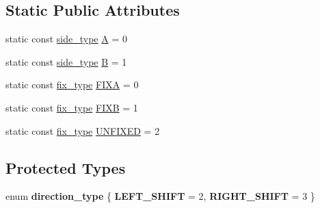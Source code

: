 \subsection*{Static Public Attributes}
\begin{DoxyCompactItemize}
\item 
static const \mbox{\hyperlink{classratio__cut__partition_ace53442bd0c1e21fbf00858ec6f6b456}{side\+\_\+type}} \mbox{\hyperlink{classratio__cut__partition_ae1a3cd1c2ede82023f9a229e40909139}{A}} = 0
\item 
static const \mbox{\hyperlink{classratio__cut__partition_ace53442bd0c1e21fbf00858ec6f6b456}{side\+\_\+type}} \mbox{\hyperlink{classratio__cut__partition_adf075987228d8adc7950d5b1ba332daa}{B}} = 1
\item 
static const \mbox{\hyperlink{classratio__cut__partition_a558dda40abda8ab03edb4605dbb81e36}{fix\+\_\+type}} \mbox{\hyperlink{classratio__cut__partition_a2fe155c63de19dc08c16bcb382f0dcbc}{F\+I\+XA}} = 0
\item 
static const \mbox{\hyperlink{classratio__cut__partition_a558dda40abda8ab03edb4605dbb81e36}{fix\+\_\+type}} \mbox{\hyperlink{classratio__cut__partition_aea621a2460229773cbc095814942963a}{F\+I\+XB}} = 1
\item 
static const \mbox{\hyperlink{classratio__cut__partition_a558dda40abda8ab03edb4605dbb81e36}{fix\+\_\+type}} \mbox{\hyperlink{classratio__cut__partition_a153cc7e51ac5d72a00671b6bdbcc6fa5}{U\+N\+F\+I\+X\+ED}} = 2
\end{DoxyCompactItemize}
\subsection*{Protected Types}
\begin{DoxyCompactItemize}
\item 
\mbox{\label{classratio__cut__partition_a8e2de20fc9f5cbe941aefa1c21c9b5ca}} 
enum {\bfseries direction\+\_\+type} \{ {\bfseries L\+E\+F\+T\+\_\+\+S\+H\+I\+FT} = 2, 
{\bfseries R\+I\+G\+H\+T\+\_\+\+S\+H\+I\+FT} = 3
 \}
\end{DoxyCompactItemize}
